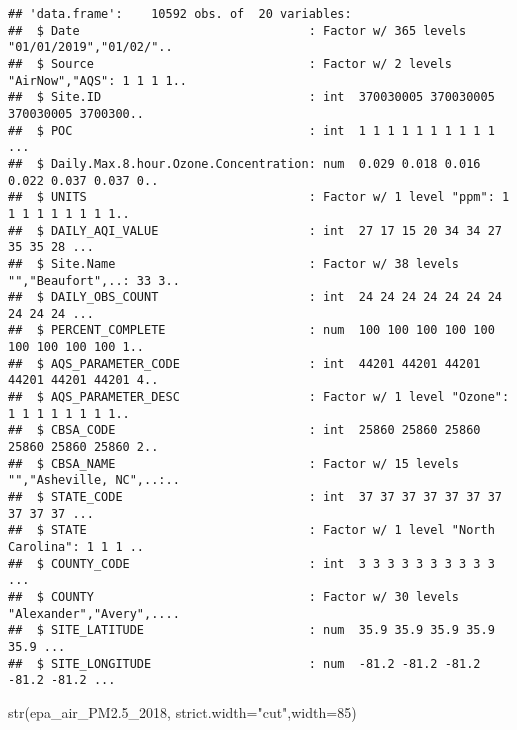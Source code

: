 \documentclass[
]{article}
\newenvironment{Shaded}{\begin{snugshade}}{\end{snugshade}}
\newcommand{\AttributeTok}[1]{\textcolor[rgb]{0.77,0.63,0.00}{#1}}
\newcommand{\DecValTok}[1]{\textcolor[rgb]{0.00,0.00,0.81}{#1}}
\newcommand{\FloatTok}[1]{\textcolor[rgb]{0.00,0.00,0.81}{#1}}
\newcommand{\FunctionTok}[1]{\textcolor[rgb]{0.00,0.00,0.00}{#1}}
\newcommand{\NormalTok}[1]{#1}
\newcommand{\StringTok}[1]{\textcolor[rgb]{0.31,0.60,0.02}{#1}}
\begin{document}
\begin{verbatim}
## 'data.frame':    10592 obs. of  20 variables:
##  $ Date                                : Factor w/ 365 levels "01/01/2019","01/02/"..
##  $ Source                              : Factor w/ 2 levels "AirNow","AQS": 1 1 1 1..
##  $ Site.ID                             : int  370030005 370030005 370030005 3700300..
##  $ POC                                 : int  1 1 1 1 1 1 1 1 1 1 ...
##  $ Daily.Max.8.hour.Ozone.Concentration: num  0.029 0.018 0.016 0.022 0.037 0.037 0..
##  $ UNITS                               : Factor w/ 1 level "ppm": 1 1 1 1 1 1 1 1 1..
##  $ DAILY_AQI_VALUE                     : int  27 17 15 20 34 34 27 35 35 28 ...
##  $ Site.Name                           : Factor w/ 38 levels "","Beaufort",..: 33 3..
##  $ DAILY_OBS_COUNT                     : int  24 24 24 24 24 24 24 24 24 24 ...
##  $ PERCENT_COMPLETE                    : num  100 100 100 100 100 100 100 100 100 1..
##  $ AQS_PARAMETER_CODE                  : int  44201 44201 44201 44201 44201 44201 4..
##  $ AQS_PARAMETER_DESC                  : Factor w/ 1 level "Ozone": 1 1 1 1 1 1 1 1..
##  $ CBSA_CODE                           : int  25860 25860 25860 25860 25860 25860 2..
##  $ CBSA_NAME                           : Factor w/ 15 levels "","Asheville, NC",..:..
##  $ STATE_CODE                          : int  37 37 37 37 37 37 37 37 37 37 ...
##  $ STATE                               : Factor w/ 1 level "North Carolina": 1 1 1 ..
##  $ COUNTY_CODE                         : int  3 3 3 3 3 3 3 3 3 3 ...
##  $ COUNTY                              : Factor w/ 30 levels "Alexander","Avery",....
##  $ SITE_LATITUDE                       : num  35.9 35.9 35.9 35.9 35.9 ...
##  $ SITE_LONGITUDE                      : num  -81.2 -81.2 -81.2 -81.2 -81.2 ...
\end{verbatim}

\begin{Shaded}
\begin{Highlighting}[]
\FunctionTok{str}\NormalTok{(epa\_air\_PM2}\FloatTok{.5}\NormalTok{\_2018, }\AttributeTok{strict.width=}\StringTok{"cut"}\NormalTok{,}\AttributeTok{width=}\DecValTok{85}\NormalTok{)}
\end{Highlighting}
\end{Shaded}
\end{document}
